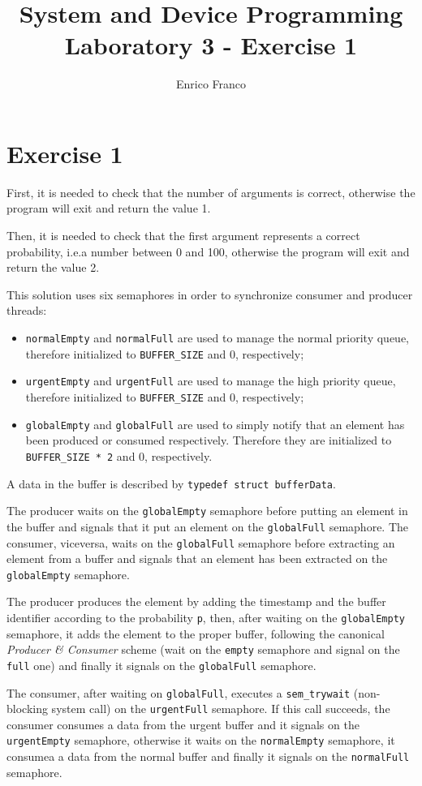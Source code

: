 \documentclass{report}
\author{Enrico Franco}
\title{System and Device Programming \\
	Laboratory 3 - Exercise 1}
\begin{document}
\section*{Exercise 1}
First, it is needed to check that the number of arguments is correct, otherwise the program will exit and return the value 1.

Then, it is needed to check that the first argument represents a correct probability, i.e.\@ a number between 0 and 100, otherwise the program will exit and return the value 2.

This solution uses six semaphores in order to synchronize consumer and producer threads:
\begin{itemize}
\item \texttt{normalEmpty} and \texttt{normalFull} are used to manage the normal priority queue, therefore initialized to \texttt{BUFFER\_SIZE} and 0, respectively;
\item \texttt{urgentEmpty} and \texttt{urgentFull} are used to manage the high priority queue, therefore initialized to \texttt{BUFFER\_SIZE} and 0, respectively;
\item \texttt{globalEmpty} and \texttt{globalFull} are used to simply notify that an element has been produced or consumed respectively. Therefore they are initialized to \texttt{BUFFER\_SIZE * 2} and 0, respectively.
\end{itemize}
A data in the buffer is described by \texttt{typedef struct bufferData}. 

The producer waits on the \texttt{globalEmpty} semaphore before putting an element in the buffer and signals that it put an element on the \texttt{globalFull} semaphore. The consumer, viceversa, waits on the \texttt{globalFull} semaphore before extracting an element from a buffer and signals that an element has been extracted on the \texttt{globalEmpty} semaphore.

The producer produces the element by adding the timestamp and the buffer identifier according to the probability \texttt{p}, then, after waiting on the \texttt{globalEmpty} semaphore, it adds the element to the proper buffer, following the canonical \emph{Producer \& Consumer} scheme (wait on the \texttt{empty} semaphore and signal on the \texttt{full} one) and finally it signals on the \texttt{globalFull} semaphore.

The consumer, after waiting on \texttt{globalFull}, executes a \texttt{sem\_trywait} (non-blocking system call) on the \texttt{urgentFull} semaphore. If this call succeeds, the consumer consumes a data from the urgent buffer and it signals on the \texttt{urgentEmpty} semaphore, otherwise it waits on the \texttt{normalEmpty} semaphore, it consumea a data from the normal buffer and finally it signals on the \texttt{normalFull} semaphore.
\end{document}
